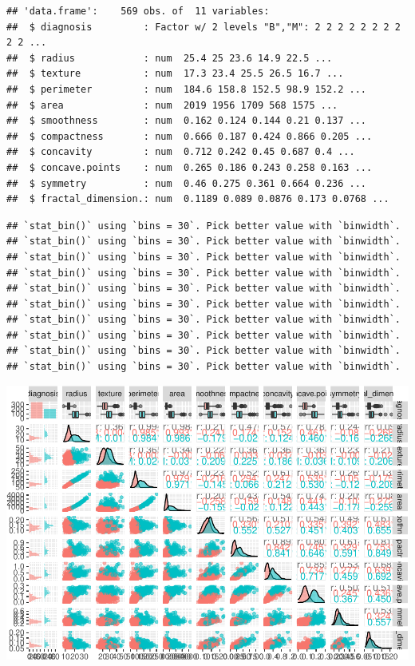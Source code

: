 \documentclass[
  11pt,
]{article}
\begin{document}
\begin{verbatim}
## 'data.frame':    569 obs. of  11 variables:
##  $ diagnosis         : Factor w/ 2 levels "B","M": 2 2 2 2 2 2 2 2 2 2 ...
##  $ radius            : num  25.4 25 23.6 14.9 22.5 ...
##  $ texture           : num  17.3 23.4 25.5 26.5 16.7 ...
##  $ perimeter         : num  184.6 158.8 152.5 98.9 152.2 ...
##  $ area              : num  2019 1956 1709 568 1575 ...
##  $ smoothness        : num  0.162 0.124 0.144 0.21 0.137 ...
##  $ compactness       : num  0.666 0.187 0.424 0.866 0.205 ...
##  $ concavity         : num  0.712 0.242 0.45 0.687 0.4 ...
##  $ concave.points    : num  0.265 0.186 0.243 0.258 0.163 ...
##  $ symmetry          : num  0.46 0.275 0.361 0.664 0.236 ...
##  $ fractal_dimension.: num  0.1189 0.089 0.0876 0.173 0.0768 ...
\end{verbatim}

\begin{verbatim}
## `stat_bin()` using `bins = 30`. Pick better value with `binwidth`.
## `stat_bin()` using `bins = 30`. Pick better value with `binwidth`.
## `stat_bin()` using `bins = 30`. Pick better value with `binwidth`.
## `stat_bin()` using `bins = 30`. Pick better value with `binwidth`.
## `stat_bin()` using `bins = 30`. Pick better value with `binwidth`.
## `stat_bin()` using `bins = 30`. Pick better value with `binwidth`.
## `stat_bin()` using `bins = 30`. Pick better value with `binwidth`.
## `stat_bin()` using `bins = 30`. Pick better value with `binwidth`.
## `stat_bin()` using `bins = 30`. Pick better value with `binwidth`.
## `stat_bin()` using `bins = 30`. Pick better value with `binwidth`.
\end{verbatim}

\includegraphics{stat_DAP_files/figure-latex/unnamed-chunk-18-2.pdf}
\end{document}
